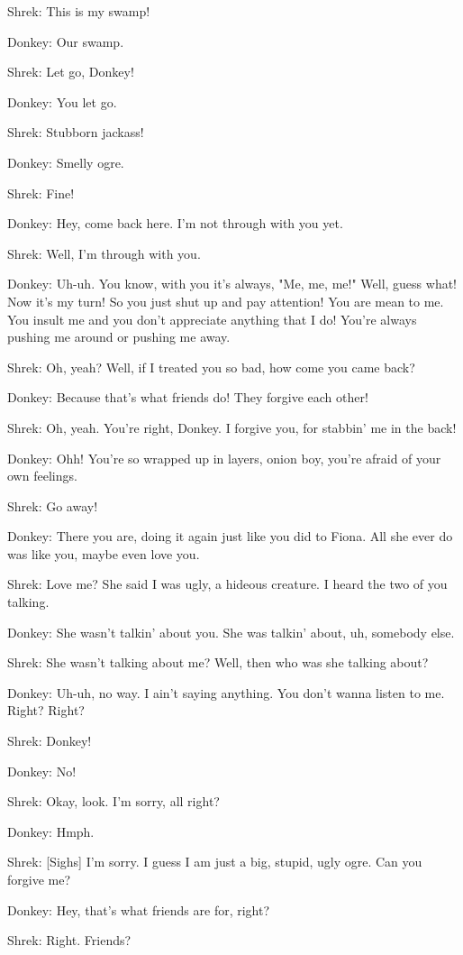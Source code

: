 \documentclass{article}
\begin{document}
Shrek:
This is my swamp!

Donkey:
Our swamp.

Shrek:
Let go, Donkey!

Donkey:
You let go.

Shrek:
Stubborn jackass!

Donkey:
Smelly ogre.

Shrek:
Fine!

Donkey:
Hey, come back here. I'm not through with you yet.

Shrek:
Well, I'm through with you.

Donkey:
Uh-uh. You know, with you it's always, "Me, me, me!" Well, guess what! Now it's my turn! So you just shut up and pay attention! You are mean to me. You insult me and you don't appreciate anything that I do! You're always pushing me around or pushing me away.

Shrek:
Oh, yeah? Well, if I treated you so bad, how come you came back?

Donkey:
Because that's what friends do! They forgive each other!

Shrek:
Oh, yeah. You're right, Donkey. I forgive you, for stabbin' me in the back!

Donkey:
Ohh! You're so wrapped up in layers, onion boy, you're afraid of your own feelings.

Shrek:
Go away!

Donkey:
There you are, doing it again just like you did to Fiona. All she ever do was like you, maybe even love you.

Shrek:
Love me? She said I was ugly, a hideous creature. I heard the two of you talking.

Donkey:
She wasn't talkin' about you. She was talkin' about, uh, somebody else.

Shrek:
She wasn't talking about me? Well, then who was she talking about?

Donkey:
Uh-uh, no way. I ain't saying anything. You don't wanna listen to me. Right? Right?

Shrek:
Donkey!

Donkey:
No!

Shrek:
Okay, look. I'm sorry, all right?

Donkey:
Hmph.

Shrek:
[Sighs] I'm sorry. I guess I am just a big, stupid, ugly ogre. Can you forgive me?

Donkey:
Hey, that's what friends are for, right?

Shrek:
Right. Friends?
\end{document}
